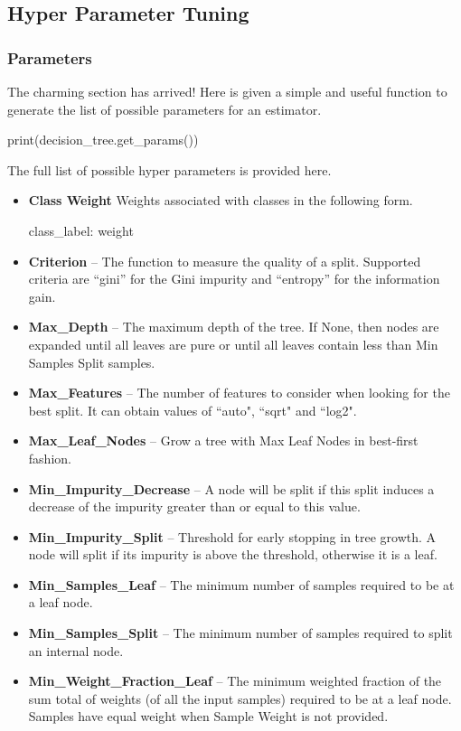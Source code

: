 \documentclass[12pt]{article}
\numberwithin{equation}{section}
\numberwithin{table}{section}
\numberwithin{figure}{section}
\begin{document}
\subsection{Hyper Parameter Tuning}
\subsubsection{Parameters}
The charming section has arrived! Here is given a simple and useful function to generate the list of possible parameters for an estimator\cite{scklearn1}.
\begin{python}
	print(decision_tree.get_params())
\end{python}
The full list of possible hyper parameters is provided here.
\begin{itemize}
	\item \textbf{Class Weight} Weights associated with classes in the following form.
		\begin{python}
				   {class_label: weight}
		\end{python}
	\item \textbf{Criterion} -- The function to measure the quality of a split. Supported criteria are “gini” for the Gini impurity and “entropy” for the information gain.
	\item \textbf{Max\_Depth} -- The maximum depth of the tree. If None, then nodes are expanded until all leaves are pure or until all leaves contain less than Min Samples Split samples.
	\item \textbf{Max\_Features} -- The number of features to consider when looking for the best split. It can obtain values of ``auto", ``sqrt" and ``log2".
	\item \textbf{Max\_Leaf\_Nodes} -- Grow a tree with Max Leaf Nodes in best-first fashion.
	\item \textbf{Min\_Impurity\_Decrease} -- A node will be split if this split induces a decrease of the impurity greater than or equal to this value.
	\item \textbf{Min\_Impurity\_Split} -- Threshold for early stopping in tree growth. A node will split if its impurity is above the threshold, otherwise it is a leaf.
	\item \textbf{Min\_Samples\_Leaf} -- The minimum number of samples required to be at a leaf node.
	\item \textbf{Min\_Samples\_Split} -- The minimum number of samples required to split an internal node.
	\item \textbf{Min\_Weight\_Fraction\_Leaf} -- The minimum weighted fraction of the sum total of weights (of all the input samples) required to be at a leaf node. Samples have equal weight when Sample Weight is not provided.

\end{itemize}
\end{document}
